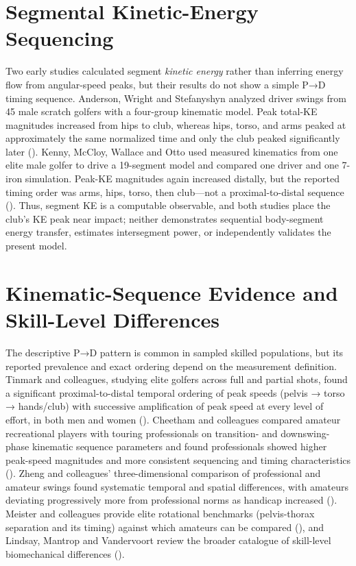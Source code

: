 \documentclass[
  letterpaper,
]{report}
\begin{document}
\section{Segmental Kinetic-Energy Sequencing}\label{sec-ke-sequencing}

Two early studies calculated segment \emph{kinetic energy} rather than
inferring energy flow from angular-speed peaks, but their results do not
show a simple P→D timing sequence. Anderson, Wright and Stefanyshyn
analyzed driver swings from 45 male scratch golfers with a four-group
kinematic model. Peak total-KE magnitudes increased from hips to club,
whereas hips, torso, and arms peaked at approximately the same
normalized time and only the club peaked significantly later
().
Kenny, McCloy, Wallace and Otto used measured kinematics from one elite
male golfer to drive a 19-segment model and compared one driver and one
7-iron simulation. Peak-KE magnitudes again increased distally, but the
reported timing order was arms, hips, torso, then club---not a
proximal-to-distal sequence (). Thus, segment KE is a computable observable, and both studies
place the club's KE peak near impact; neither demonstrates sequential
body-segment energy transfer, estimates intersegment power, or
independently validates the present model.

\section{Kinematic-Sequence Evidence and Skill-Level
Differences}\label{sec-skill}

The descriptive P→D pattern is common in sampled skilled populations,
but its reported prevalence and exact ordering depend on the measurement
definition. Tinmark and colleagues, studying elite golfers across full
and partial shots, found a significant proximal-to-distal temporal
ordering of peak speeds (pelvis → torso → hands/club) with successive
amplification of peak speed at every level of effort, in both men and
women (). Cheetham and
colleagues compared amateur recreational players with touring
professionals on transition- and downswing-phase kinematic sequence
parameters and found professionals showed higher peak-speed magnitudes
and more consistent sequencing and timing characteristics
(). Zheng and
colleagues' three-dimensional comparison of professional and amateur
swings found systematic temporal and spatial differences, with amateurs
deviating progressively more from professional norms as handicap
increased (). Meister and
colleagues provide elite rotational benchmarks (pelvis-thorax separation
and its timing) against which amateurs can be compared
(), and Lindsay, Mantrop
and Vandervoort review the broader catalogue of skill-level
biomechanical differences ().
\end{document}
